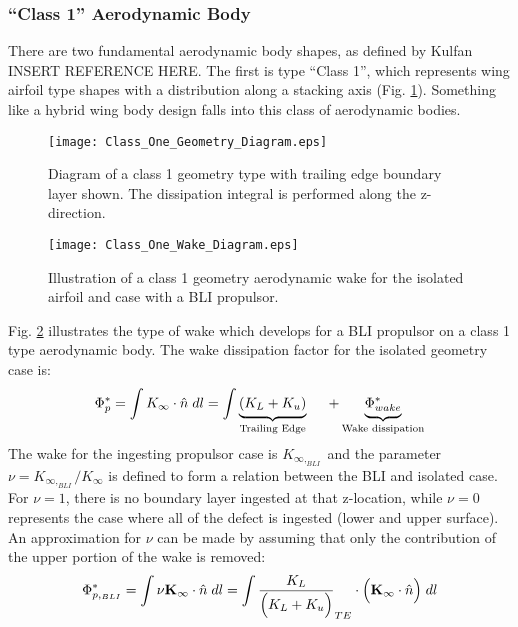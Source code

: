 				\subsubsection{``Class 1'' Aerodynamic Body}
					There are two fundamental aerodynamic body shapes, as defined by Kulfan INSERT REFERENCE HERE.  The first is type ``Class 1'', which represents wing airfoil type shapes with a distribution along a stacking axis (Fig. \ref{Class_One_Geometry_Diagram}).  Something like a hybrid wing body design falls into this class of aerodynamic bodies.  					
					\begin{figure}[htp]
						\centering
						\texttt{[image: Class\_One\_Geometry\_Diagram.eps]}
						\caption{Diagram of a class 1 geometry type with trailing edge boundary layer shown.  The dissipation integral is performed along the z-direction.}
						\label{Class_One_Geometry_Diagram}
					\end{figure}									
					\begin{figure}[htp]
						\centering
						\texttt{[image: Class\_One\_Wake\_Diagram.eps]}
						\caption{Illustration of a class 1 geometry aerodynamic wake for the isolated airfoil and case with a BLI propulsor.}
						\label{Class_One_Wake_Diagram}
					\end{figure}
					Fig. \ref{Class_One_Wake_Diagram} illustrates the type of wake which develops for a BLI propulsor on a class 1 type aerodynamic body.  The wake dissipation factor for the isolated geometry case is:
					\begin{equation}
					\Phi_p^* = \int K_\infty \cdot \hat{n} \hspace{1mm} dl  = \int \underbrace{\strut (K_L + K_u)}_{\text{Trailing Edge}} \hspace{5mm} + \underbrace{\strut \Phi_{wake}^*}_{\text{Wake dissipation}}
					\end{equation}					
					The wake for the ingesting propulsor case is $K_{\infty,_{BLI}}$ and the parameter $\nu = K_{\infty,_{BLI}}/K_\infty$ is defined to form a relation between the BLI and isolated case.  For $\nu = 1$, there is no boundary layer ingested at that z-location, while $\nu = 0$ represents the case where all of the defect is ingested (lower and upper surface).  An approximation for $\nu$ can be made by assuming that only the contribution of the upper portion of the wake is removed:
					\begin{equation}
						\Phi_{p,_{BLI}}^* = \int \nu \textbf{K}_{\infty} \cdot \hat{n} \hspace{1mm} dl= \int \frac{K_L}{\Big(K_L + K_u\Big)}_{TE} \cdot \Big(\textbf{K}_\infty \cdot \hat{n}\Big) \hspace{1mm} dl
						\label{Phi_P_Star}
					\end{equation} 
